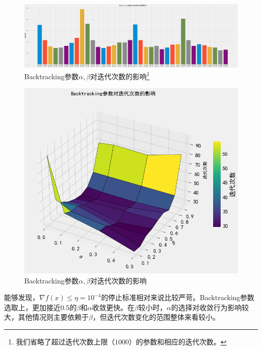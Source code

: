 \documentclass{homework}
\begin{document}
\begin{sol}
\begin{figure}[h]
    \centering
    \includegraphics[width=1\linewidth]{3-3.png}
    \caption{Backtracking参数$\alpha, \beta$对迭代次数的影响\protect\footnote{我们省略了超过迭代次数上限（$1000$）的参数和相应的迭代次数。}}
\end{figure}
\begin{figure}[h]
    \centering
    \includegraphics[width=0.5\linewidth]{3-4.png}
    \caption{Backtracking参数$\alpha, \beta$对迭代次数的影响}
\end{figure}


能够发现，$\nabla f(x) \le \eta = 10^{-4}$的停止标准相对来说比较严苛。Backtracking参数选取上，更加接近$0.5$的$\beta$和$\alpha$收敛更快。在$\beta$较小时，$\alpha$的选择对收敛行为影响较大，其他情况则主要依赖于$\beta$，但迭代次数变化的范围整体来看较小。

\end{sol}

\question 
\end{document}
